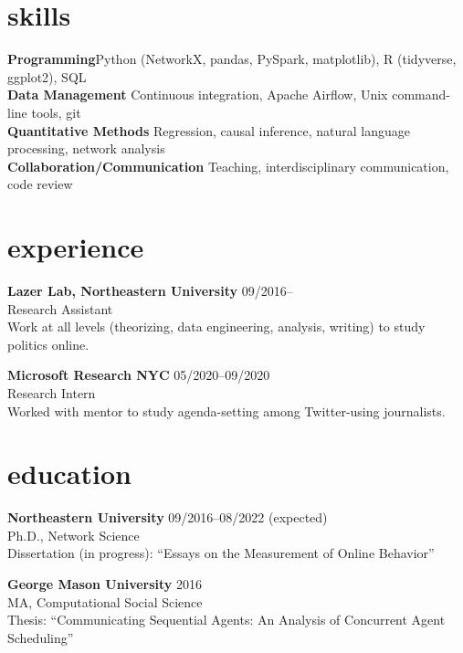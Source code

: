 \documentclass[11pt, letter]{article}
\title{}
\begin{document}
\maketitle
\section{skills}
\textbf{Programming}\hfill Python (NetworkX, pandas, PySpark, matplotlib), R (tidyverse, ggplot2), SQL\\ \vspace{1mm}
\textbf{Data Management} \hfill Continuous integration, Apache Airflow, Unix command-line tools, git\\\vspace{1mm}
\textbf{Quantitative Methods} \hfill Regression, causal inference, natural language processing, network analysis\\\vspace{1mm}
\textbf{Collaboration/Communication} \hfill Teaching, interdisciplinary communication, code review


\section{experience}
\textbf{Lazer Lab, Northeastern University} \hfill 09/2016-- \\
Research Assistant \\
Work at all levels (theorizing, data engineering, analysis, writing) to study politics online.

\vspace{3mm}
\textbf{Microsoft Research NYC}  \hfill 05/2020--09/2020 \\
Research Intern \\
Worked with mentor to study agenda-setting among Twitter-using journalists.

\vspace{-1mm}

\section{education}
\textbf{Northeastern University}  \hfill 09/2016--08/2022 (expected) \\
Ph.D., Network Science \\
Dissertation (in progress): ``Essays on the Measurement of Online Behavior''
\vspace{3mm}

\textbf{George Mason University}  \hfill 2016 \\
MA, Computational Social Science \\
Thesis: ``Communicating Sequential Agents: An Analysis of Concurrent Agent Scheduling''
\vspace{3mm}
\end{document}
